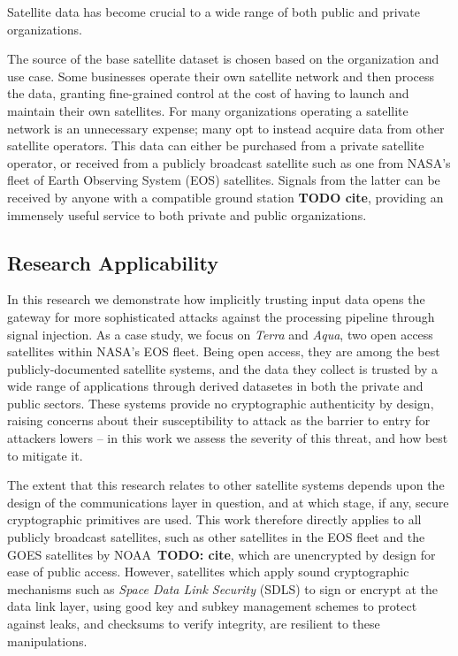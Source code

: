 Satellite data has become crucial to a wide range of both public and private organizations.


The source of the base satellite dataset is chosen based on the organization and use case.
Some businesses operate their own satellite network and then process the data, granting fine-grained control at the cost of having to launch and maintain their own satellites.
For many organizations operating a satellite network is an unnecessary expense; many opt to instead acquire data from other satellite operators.
This data can either be purchased from a private satellite operator, or received from a publicly broadcast satellite such as one from NASA's fleet of Earth Observing System (EOS) satellites.
Signals from the latter can be received by anyone with a compatible ground station \textbf{TODO cite}, providing an immensely useful service to both private and public organizations.



\subsection{Research Applicability}

In this research we demonstrate how implicitly trusting input data opens the gateway for more sophisticated attacks against the processing pipeline through signal injection.
As a case study, we focus on \textit{Terra} and \textit{Aqua}, two open access satellites within NASA's EOS fleet.
Being open access, they are among the best publicly-documented satellite systems, and the data they collect is trusted by a wide range of applications through derived datasetes in both the private and public sectors.
These systems provide no cryptographic authenticity by design, raising concerns about their susceptibility to attack as the barrier to entry for attackers lowers -- in this work we assess the severity of this threat, and how best to mitigate it.

The extent that this research relates to other satellite systems depends upon the design of the communications layer in question, and at which stage, if any, secure cryptographic primitives are used.
This work therefore directly applies to all publicly broadcast satellites, such as other satellites in the EOS fleet and the GOES satellites by NOAA~\textbf{TODO: cite}, which are unencrypted by design for ease of public access. %
However, satellites which apply sound cryptographic mechanisms such as \textit{Space Data Link Security} (SDLS) to sign or encrypt at the data link layer, using good key and subkey management schemes to protect against leaks, and checksums to verify integrity, are resilient to these manipulations.

